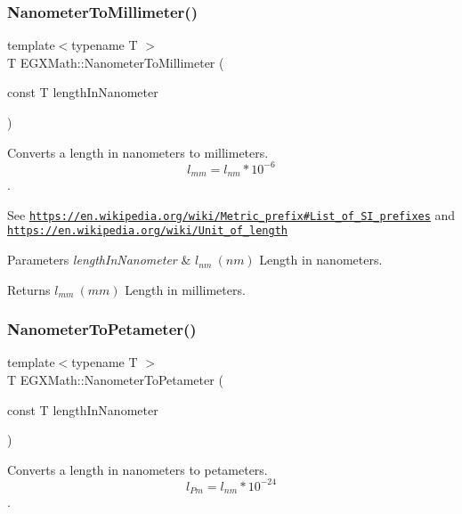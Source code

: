 \subsubsection{\texorpdfstring{Nanometer\+To\+Millimeter()}{NanometerToMillimeter()}}
{\footnotesize\ttfamily template$<$typename T $>$ \\
T E\+G\+X\+Math\+::\+Nanometer\+To\+Millimeter (\begin{DoxyParamCaption}\item[{const T}]{length\+In\+Nanometer }\end{DoxyParamCaption})}



Converts a length in nanometers to millimeters. \[ l_{mm}=l_{nm} * 10^{-6} \]. 

See \href{https://en.wikipedia.org/wiki/Metric_prefix#List_of_SI_prefixes}{\tt https\+://en.\+wikipedia.\+org/wiki/\+Metric\+\_\+prefix\#\+List\+\_\+of\+\_\+\+S\+I\+\_\+prefixes} and \href{https://en.wikipedia.org/wiki/Unit_of_length}{\tt https\+://en.\+wikipedia.\+org/wiki/\+Unit\+\_\+of\+\_\+length} 
\begin{DoxyParams}{Parameters}
{\em length\+In\+Nanometer} & $ l_{nm}\ (nm)$ Length in nanometers. \\
\hline
\end{DoxyParams}
\begin{DoxyReturn}{Returns}
$ l_{mm}\ (mm)$ Length in millimeters. 
\end{DoxyReturn}
\mbox{\label{group___e_g_x_math-_conversions-_length_conversions-_nanometer-_s_i_ga61c4ec1200cb2e909920c108d676d6e6}} 
\subsubsection{\texorpdfstring{Nanometer\+To\+Petameter()}{NanometerToPetameter()}}
{\footnotesize\ttfamily template$<$typename T $>$ \\
T E\+G\+X\+Math\+::\+Nanometer\+To\+Petameter (\begin{DoxyParamCaption}\item[{const T}]{length\+In\+Nanometer }\end{DoxyParamCaption})}



Converts a length in nanometers to petameters. \[ l_{Pm}=l_{nm} * 10^{-24} \]. 

